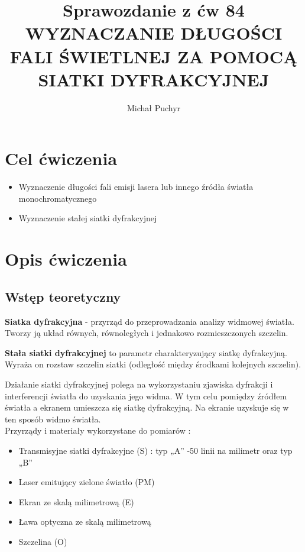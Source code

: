 \documentclass[12pt]{article}
\author{Michał Puchyr}
\title{Sprawozdanie z ćw 84 \\
WYZNACZANIE DŁUGOŚCI FALI ŚWIETLNEJ
ZA POMOCĄ SIATKI DYFRAKCYJNEJ}
\begin{document}
\maketitle

\section{Cel ćwiczenia}
\begin{itemize}
    \item Wyznaczenie długości fali emisji lasera lub innego źródła światła
    monochromatycznego
    \item Wyznaczenie stałej siatki dyfrakcyjnej
\end{itemize}

\section{Opis ćwiczenia}
\subsection{Wstęp teoretyczny}

\textbf{Siatka dyfrakcyjna} - przyrząd do przeprowadzania analizy widmowej światła. Tworzy ją układ równych, równoległych i jednakowo rozmieszczonych szczelin.

\textbf{Stała siatki dyfrakcyjnej} to parametr charakteryzujący siatkę dyfrakcyjną. Wyraża on rozstaw szczelin siatki (odległość między środkami kolejnych szczelin).

Działanie siatki dyfrakcyjnej polega na wykorzystaniu zjawiska dyfrakcji i interferencji światła do uzyskania jego widma. 
W tym celu pomiędzy źródłem światła a ekranem umieszcza się siatkę dyfrakcyjną. 
Na ekranie uzyskuje się w ten sposób widmo światła. \\

Przyrządy i materiały wykorzystane do pomiarów : 

\begin{itemize}
    \item Transmisyjne siatki dyfrakcyjne (S) : typ „A” -50 linii na milimetr oraz typ „B”
    \item Laser emitujący zielone światło (PM)
    \item Ekran ze skalą milimetrową (E)
    \item Ława optyczna ze skalą milimetrową
    \item Szczelina (O)
\end{itemize}
\end{document}
